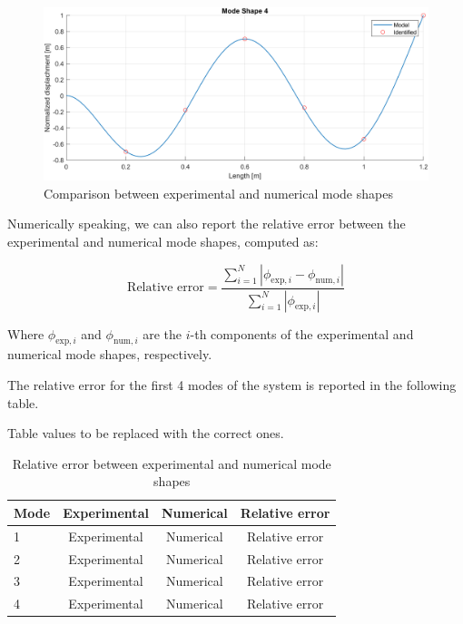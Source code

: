 \begin{figure}[H]
    \begin{minipage}[b]{0.45\textwidth}
        \centering
        \includegraphics[width=\textwidth]{img/MATLAB/Part_A/Comparison_ModeShape_04.png}
    \end{minipage}
    \caption{Comparison between experimental and numerical mode shapes}
    \label{fig:Mode_shapes_comparison}
\end{figure}

Numerically speaking, we can also report the relative error between the experimental and numerical mode shapes, computed as:

\begin{equation}
    \text{Relative error} = \frac{\sum_{i=1}^{N} \left| \phi_{\text{exp},i} - \phi_{\text{num},i} \right|}{\sum_{i=1}^{N} \left| \phi_{\text{exp},i} \right|}
\end{equation}

Where $\phi_{\text{exp},i}$ and $\phi_{\text{num},i}$ are the $i$-th components of the experimental and numerical mode shapes, respectively.

The relative error for the first 4 modes of the system is reported in the following table.

\begin{center}
    \huge{Table values to be replaced with the correct ones.}
\end{center}

\begin{table}[H]
    \centering
    \begin{tabular}{lccc}
        \hline
        Mode & Experimental & Numerical & Relative error \\
        \hline
        1    & Experimental & Numerical & Relative error \\
        2    & Experimental & Numerical & Relative error \\
        3    & Experimental & Numerical & Relative error \\
        4    & Experimental & Numerical & Relative error \\
        \hline
    \end{tabular}
    \caption{Relative error between experimental and numerical mode shapes}
    \label{tab:Relative_error_mode_shapes}
\end{table}
